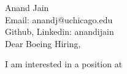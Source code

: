 \documentclass[11pt,a4paper]{letter} %
\begin{document}
Anand Jain\\
Email: anandj@uchicago.edu \\
Github, Linkedin: anandijain\\

Dear Boeing Hiring,



I am interested in a position at 
\end{document}
